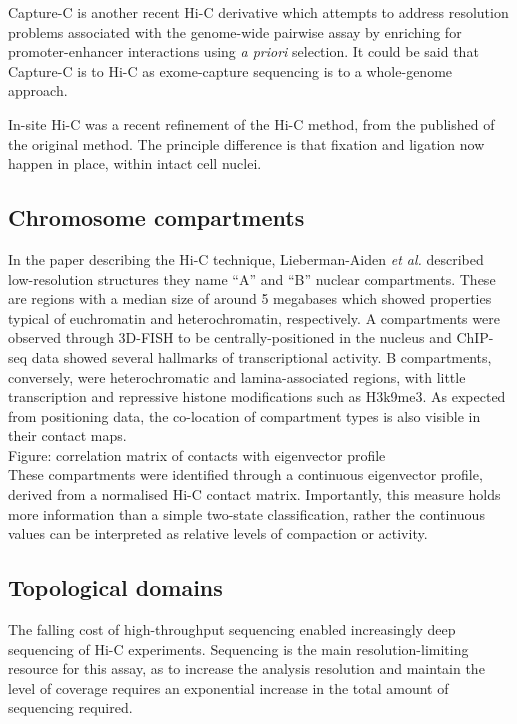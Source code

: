 \documentclass[a4paper,10pt,oneside]{book}
\begin{document}
Capture-C is another recent Hi-C derivative which attempts to address resolution problems associated with the genome-wide pairwise assay by enriching for promoter-enhancer interactions using \emph{a priori} selection.\cite{Mifsud2015} It could be said that Capture-C is to Hi-C as exome-capture sequencing is to a whole-genome approach. 

In-site Hi-C was a recent refinement of the Hi-C method, from the published of the original method.\cite{Rao2014} The principle difference is that fixation and ligation now happen in place, within intact cell nuclei.

\subsection{Chromosome compartments}

In the paper describing the Hi-C technique,\cite{Lieberman2009}  Lieberman-Aiden \emph{et
  al.} described low-resolution structures they name  ``A'' and ``B'' nuclear compartments. These are regions with a median size of around 5 megabases which showed properties typical
of euchromatin and heterochromatin, respectively. A compartments were observed through 3D-FISH to be centrally-positioned in the nucleus and  ChIP-seq data showed several hallmarks of transcriptional activity. B compartments, conversely, were heterochromatic and lamina-associated regions, with little transcription and repressive histone modifications such as H3k9me3.\cite{Lieberman2009} As expected from positioning data, the co-location of compartment types is also visible in their contact maps. \\

{\color{red} Figure: correlation matrix of contacts with eigenvector profile} \\

These compartments were identified through a continuous eigenvector profile, derived from a normalised Hi-C contact matrix.\cite{Lieberman2009} Importantly, this measure holds more information than a simple two-state classification, rather the continuous values can be interpreted as relative levels of compaction or activity.\cite{Dekker2013, Imakaev2012}

\subsection{Topological domains}

The falling cost of high-throughput sequencing enabled increasingly deep sequencing of Hi-C experiments. Sequencing is the main resolution-limiting resource for this assay, as to increase the analysis resolution and maintain the level of coverage requires an exponential increase in the total amount of sequencing required.\cite{Lieberman2009}
\end{document}
